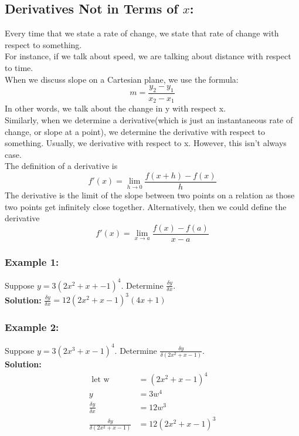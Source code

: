 \documentclass{article}
\begin{document}
\subsection{Derivatives Not in Terms of $x$:}
Every time that we state a rate of change, we state that rate of change with respect to something.\\
For instance, if we talk about speed, we are talking about distance with respect to time.\\
When we discuss slope on a Cartesian plane, we use the formula:
$$m=\frac{y_2-y_1}{x_2-x_1}$$
In other words, we talk about the change in y with respect x.\\
Similarly, when we determine a derivative(which is just an instantaneous rate of change, or slope at a point), we determine the derivative with respect to something. Usually, we derivative with respect to x. However, this isn't always case.\\

The definition of a derivative is 
$$f'(x)=\lim_{h \to 0}\frac{f(x+h)-f(x)}{h}$$
The derivative is the limit of the slope between two points on a relation as those two points get infinitely close together. Alternatively, then we could define the derivative $$f'(x)= \lim_{x \to a }\frac{f(x)-f(a)}{x-a}$$

\subsubsection*{Example 1:}
Suppose $y=3(2x^2+x+-1)^4$. Determine $\frac{\delta y}{\delta x}$.\\
\textbf{Solution:}
$\frac{\delta y}{\delta x}=12(2x^2+x-1)^3(4x+1)$
\subsubsection*{Example 2:}
Suppose $y=3(2x^3+x-1)^4$. Determine $\frac{\delta y}{\delta(2x^2+x-1)}$.\\
\textbf{Solution:}
\begin{align*}
    \text{ let w } &= (2x^2+x-1)^4\\
    y&=3w^4\\
    \frac{\delta y}{\delta x}&=12w^3\\
    \frac{\delta y}{\delta(2x^2+x-1)}&=12(2x^2+x-1)^3
\end{align*}
\end{document}
